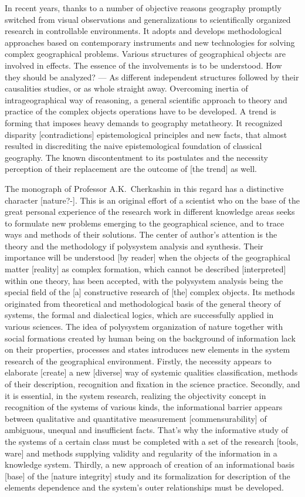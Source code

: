 \documentclass[12pt,leqno]{book}
\begin{document}
In recent years, thanks to a number of objective reasons geography promptly switched from visual observations and generalizations to scientifically organized research in controllable environments. It adopts and develops methodological approaches based on contemporary instruments and new technologies for solving complex geographical problems. Various structures of geographical objects are involved in effects. The essence of the involvements is to be understood. How they should be analyzed? --- As different independent structures followed by their causalities studies, or as whole straight away. Overcoming inertia of intrageographical way of reasoning, a general scientific approach to theory and practice of the complex objects operations have to be developed. A trend is forming that imposes heavy demands to geography metatheory. It recognized disparity [contradictions] epistemological principles and new facts, that almost resulted in discrediting the naive epistemological foundation of classical geography. The known discontentment to its postulates and the necessity perception of their replacement are the outcome of [the trend] as well.

The monograph of Professor A.K.~Cherkashin in this regard has a distinctive character [nature?-]. This is an original effort of a scientist who on the base of the great personal experience of the research work in different knowledge areas seeks to formulate new problems emerging to the geographical science, and to trace ways and methods of their solutions. The center of author's attention is the theory and the methodology if polysystem analysis and synthesis. Their importance will be understood [by reader] when the objects of the geographical matter [reality] as complex formation, which cannot be described [interpreted] within one theory, has been accepted, with the polysystem analysis being the special field of the [a] constructive research of [the] complex objects. Its methods originated from theoretical and methodological basis of the general theory of systems, the formal and dialectical logics, which are successfully applied in various sciences. The idea of polysystem organization of nature together with social formations created by human being on the background of information lack on their properties, processes and states introduces new elements in the system research of the geographical environment. Firstly, the necessity appears to elaborate [create] a new [diverse] way of systemic qualities classification, methods of their description, recognition and fixation in the science practice. Secondly, and it is essential, in the system research, realizing the objectivity concept in recognition of the systems of various kinds, the informational barrier appears between qualitative and quantitative measurement [commensurability] of ambiguous, unequal and insufficient facts. That's why the informative study of the systems of a certain class must be completed with a set of the research [tools, ware] and methods supplying validity and regularity of the information in a knowledge system. Thirdly, a new approach of creation of an informational basis [base] of the [nature integrity] study and its formalization for description of the elements dependence and the system's outer relationships must be developed.
\end{document}
